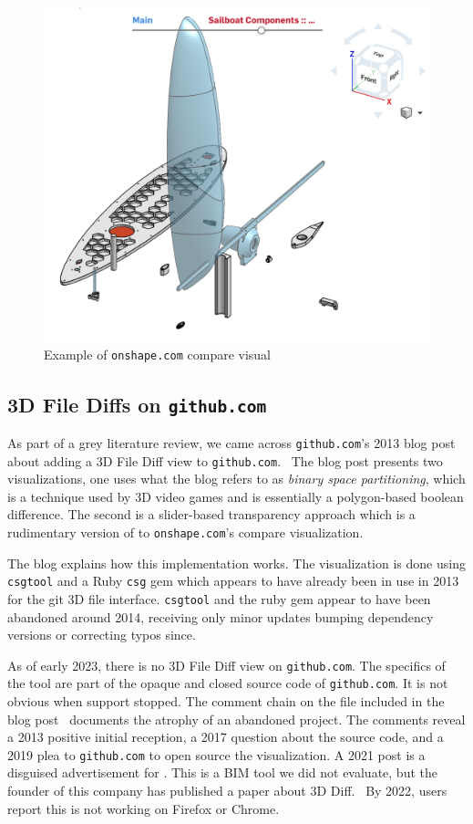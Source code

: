\documentclass[sigconf,authorversion,nonacm]{acmart}
\begin{document}
\begin{figure}[t]
	\includegraphics[width=\linewidth]{onshapescreenshot.png}
	\caption{Example of \texttt{onshape.com} compare visual}
	\label{fig:onshapescreenshot}
\end{figure}

\subsection{3D File Diffs on \texttt{github.com}}

As part of a grey literature review, we came across \texttt{github.com}'s 2013 blog post about adding a 3D File Diff view to \texttt{github.com}.~\cite{github_blog_2013}
The blog post presents two visualizations, one uses what the blog refers to as \emph{binary space partitioning}, which is a technique used by 3D video games and is essentially a polygon-based boolean difference.
The second is a slider-based transparency approach which is a rudimentary version of to \texttt{onshape.com}'s compare visualization.

The blog explains how this implementation works.
The visualization is done using \texttt{csgtool} and a Ruby \texttt{csg} gem which appears to have already been in use in 2013 for the git 3D file interface.
\texttt{csgtool} and the ruby gem appear to have been abandoned around 2014, receiving only minor updates bumping dependency versions or correcting typos since.

As of early 2023, there is no 3D File Diff view on \texttt{github.com}.
The specifics of the tool are part of the opaque and closed source code of \texttt{github.com}.
It is not obvious when support stopped.
The comment chain on the file included in the blog post~\cite{death_of_a_diffsman} documents the atrophy of an abandoned project.
The comments reveal a 2013 positive initial reception, a 2017 question about the source code, and a 2019 plea to \texttt{github.com} to open source the visualization.
A 2021 post is a disguised advertisement for \citet{3drepoblog}.
This is a BIM tool we did not evaluate, but the founder of this company has published a paper about 3D Diff.~\cite{Dobos}
By 2022, users report this is not working on Firefox or Chrome.
\end{document}
